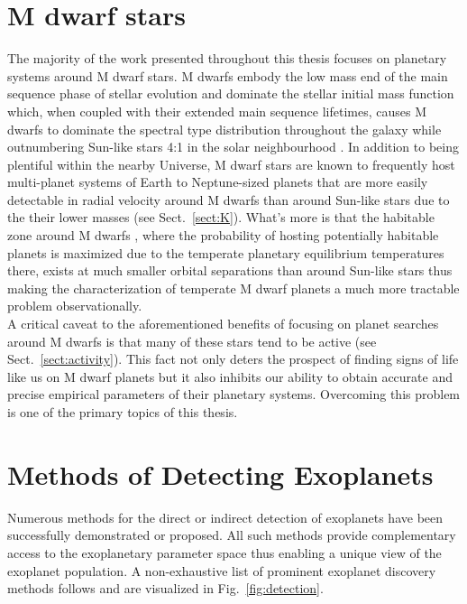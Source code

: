 \section{M dwarf stars} \label{sect:Mdwarfs}
The majority of the work presented throughout this thesis focuses on planetary systems
around M dwarf stars. M dwarfs embody the low mass end of the main sequence
phase of stellar evolution and dominate the stellar initial mass function
\citep{kroupa01} which, when
coupled with their extended main sequence lifetimes, causes M dwarfs to dominate the
spectral type distribution throughout the galaxy while outnumbering Sun-like stars
4:1 in the solar neighbourhood \citep{winters15}. In addition to being plentiful
within the nearby Universe, M dwarf stars are known to frequently host multi-planet
systems of Earth to Neptune-sized planets \citep{dressing15a,gaidos16} that
are more easily detectable in radial velocity around M dwarfs than around Sun-like stars
due to the their lower masses (see Sect.~\ref{sect:K}). What's more is that the habitable zone
around M dwarfs \citep{kasting93,kopparapu13}, where the probability of hosting potentially
habitable planets is maximized due to the temperate planetary equilibrium temperatures there,
exists at much smaller orbital separations than around Sun-like stars thus making the
characterization of temperate M dwarf planets a much more tractable problem observationally. \\

A critical caveat to the aforementioned benefits of focusing on planet searches around M dwarfs
is that many of these stars tend to be active (see Sect.~\ref{sect:activity}). This fact not only
deters the prospect of finding signs of life like us on M dwarf planets but it also inhibits
our ability to obtain accurate and precise empirical parameters of their planetary systems.
Overcoming this problem is one of the primary topics of this thesis.

  
\section{Methods of Detecting Exoplanets} \label{sect:detection}
Numerous methods for the direct or indirect detection of exoplanets
have been successfully demonstrated or proposed. All such methods provide complementary
access to the exoplanetary parameter space thus enabling a unique view of the exoplanet
population. A non-exhaustive list of prominent exoplanet discovery methods follows and are
visualized in Fig.~\ref{fig:detection}. \\

